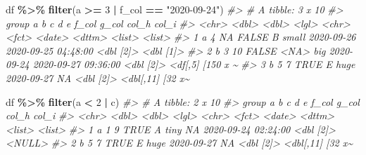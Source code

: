 \documentclass[
]{report}
\newenvironment{Shaded}{\begin{snugshade}}{\end{snugshade}}
\newcommand{\CommentTok}[1]{\textcolor[rgb]{0.56,0.35,0.01}{\textit{#1}}}
\newcommand{\DecValTok}[1]{\textcolor[rgb]{0.00,0.00,0.81}{#1}}
\newcommand{\KeywordTok}[1]{\textcolor[rgb]{0.13,0.29,0.53}{\textbf{#1}}}
\newcommand{\NormalTok}[1]{#1}
\newcommand{\OperatorTok}[1]{\textcolor[rgb]{0.81,0.36,0.00}{\textbf{#1}}}
\newcommand{\StringTok}[1]{\textcolor[rgb]{0.31,0.60,0.02}{#1}}
\begin{document}
\begin{Shaded}
\begin{Highlighting}[]
\NormalTok{df }\OperatorTok{\%\textgreater{}\%}
\StringTok{  }\KeywordTok{filter}\NormalTok{(a }\OperatorTok{\textgreater{}=}\StringTok{ }\DecValTok{3} \OperatorTok{|}\StringTok{ }\NormalTok{f\_col }\OperatorTok{==}\StringTok{ "2020{-}09{-}24"}\NormalTok{)}
\CommentTok{\#\textgreater{} \# A tibble: 3 x 10}
\CommentTok{\#\textgreater{}   group     a     b c     d     e     f\_col      g\_col               col\_h     col\_i           }
\CommentTok{\#\textgreater{}   \textless{}chr\textgreater{} \textless{}dbl\textgreater{} \textless{}dbl\textgreater{} \textless{}lgl\textgreater{} \textless{}chr\textgreater{} \textless{}fct\textgreater{} \textless{}date\textgreater{}     \textless{}dttm\textgreater{}              \textless{}list\textgreater{}    \textless{}list\textgreater{}          }
\CommentTok{\#\textgreater{} 1 a         4    NA FALSE B     small 2020{-}09{-}26 2020{-}09{-}25 04:48:00 \textless{}dbl [2]\textgreater{} \textless{}dbl [1]\textgreater{}       }
\CommentTok{\#\textgreater{} 2 b         3    10 FALSE \textless{}NA\textgreater{}  big   2020{-}09{-}24 2020{-}09{-}27 09:36:00 \textless{}dbl [2]\textgreater{} \textless{}df[,5] [150 x \textasciitilde{}}
\CommentTok{\#\textgreater{} 3 b         5     7 TRUE  E     huge  2020{-}09{-}27 NA                  \textless{}dbl [2]\textgreater{} \textless{}dbl[,11] [32 x\textasciitilde{}}
\end{Highlighting}
\end{Shaded}

\begin{Shaded}
\begin{Highlighting}[]
\NormalTok{df }\OperatorTok{\%\textgreater{}\%}
\StringTok{  }\KeywordTok{filter}\NormalTok{(a }\OperatorTok{\textless{}}\StringTok{ }\DecValTok{2} \OperatorTok{|}\StringTok{ }\NormalTok{c)}
\CommentTok{\#\textgreater{} \# A tibble: 2 x 10}
\CommentTok{\#\textgreater{}   group     a     b c     d     e     f\_col      g\_col               col\_h     col\_i           }
\CommentTok{\#\textgreater{}   \textless{}chr\textgreater{} \textless{}dbl\textgreater{} \textless{}dbl\textgreater{} \textless{}lgl\textgreater{} \textless{}chr\textgreater{} \textless{}fct\textgreater{} \textless{}date\textgreater{}     \textless{}dttm\textgreater{}              \textless{}list\textgreater{}    \textless{}list\textgreater{}          }
\CommentTok{\#\textgreater{} 1 a         1     9 TRUE  A     tiny  NA         2020{-}09{-}24 02:24:00 \textless{}dbl [2]\textgreater{} \textless{}NULL\textgreater{}          }
\CommentTok{\#\textgreater{} 2 b         5     7 TRUE  E     huge  2020{-}09{-}27 NA                  \textless{}dbl [2]\textgreater{} \textless{}dbl[,11] [32 x\textasciitilde{}}
\end{Highlighting}
\end{Shaded}
\end{document}
